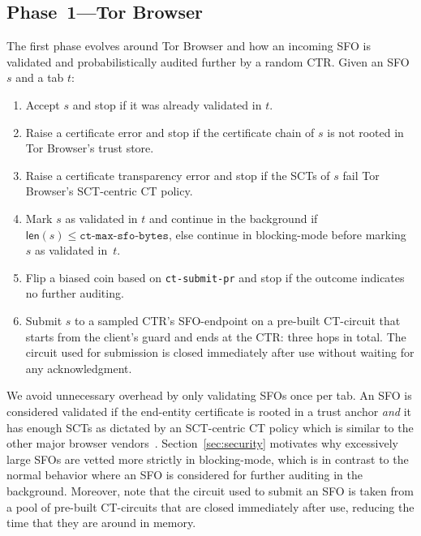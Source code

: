 \subsection{Phase~1---Tor Browser} \label{sec:design-ca:phase1}
The first phase evolves around Tor Browser and how an incoming SFO is validated
and probabilistically audited further by a random CTR.  Given an SFO $s$ and
a tab $t$:
\begin{enumerate}
	\item Accept $s$ and stop if it was already validated in $t$.
	\item Raise a certificate error and stop if the certificate chain of $s$
		is not rooted in Tor Browser's trust store.
	\item Raise a certificate transparency error and stop if the SCTs of $s$
		fail Tor Browser's SCT-centric CT policy.
	\item Mark $s$ as validated in $t$ and continue in the background if
		$\mathsf{len}(s) \le \texttt{ct-max-sfo-bytes}$, else continue in
		blocking-mode before marking $s$ as validated in~$t$.
	\item Flip a biased coin based on \texttt{ct-submit-pr} and stop if the
		outcome indicates no further auditing.
	\item Submit $s$ to a sampled CTR's SFO-endpoint on a pre-built CT-circuit
		that starts from the client's guard and ends at the CTR: three hops in
		total.  The circuit used for submission is closed immediately after
		use without waiting for any acknowledgment.
\end{enumerate}

We avoid unnecessary overhead by only validating SFOs once per tab.  An SFO is
considered validated if the end-entity certificate is rooted in a trust anchor
\emph{and} it has enough SCTs as dictated by an SCT-centric CT policy which is
similar to the other major browser vendors~\cite{chrome-policy,safari-policy}.
Section~\ref{sec:security} motivates why excessively large SFOs are vetted more
strictly in blocking-mode, which is in contrast to the normal behavior where an
SFO is considered for further auditing in the background.  Moreover, note that
the circuit used to submit an SFO is taken from a pool of pre-built CT-circuits
that are closed immediately after use, reducing the time that they are around in
memory.

%
%

